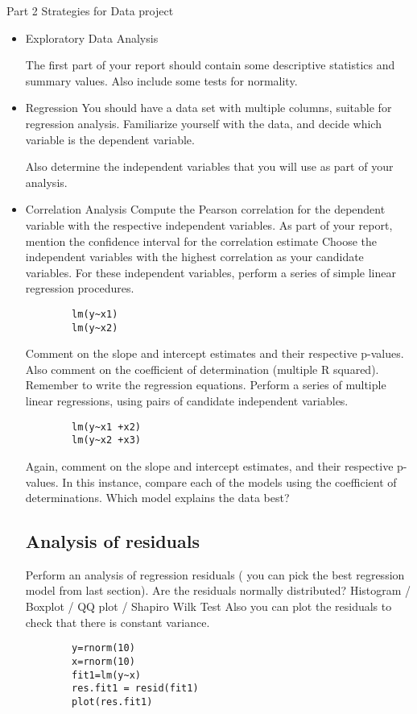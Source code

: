 \documentclass[a4paper,12pt]{article}
\begin{document}
	Part 2 Strategies for Data project
	\begin{itemize}
		\item Exploratory Data Analysis
		
		The first part of your report should contain some descriptive statistics and summary values. Also include some tests for normality.
		
		\item{Regression}
		You should have a data set with multiple columns, suitable for regression analysis.
		Familiarize yourself with the data, and decide which variable is the dependent variable.
		
		Also determine the independent variables that you will use as part of your analysis.
		
		\item{Correlation Analysis}
		Compute the Pearson correlation for the dependent variable with the respective independent variables.  As part of your report, mention the confidence interval for the correlation estimate
		Choose the independent variables with the highest correlation as your candidate variables.
		For these independent variables, perform a series of simple linear regression procedures.
		\begin{verbatim}
		lm(y~x1)
		lm(y~x2)
		\end{verbatim}
		Comment on the slope and intercept estimates and their respective p-values. Also comment on the coefficient of determination (multiple R squared). Remember to write the regression equations.
		Perform a series of multiple linear regressions, using pairs of candidate independent variables.
		\begin{verbatim}
		lm(y~x1 +x2)
		lm(y~x2 +x3)
		\end{verbatim}
		Again, comment on the slope and intercept estimates, and their respective p-values.
		In this instance, compare each of the models using the coefficient of determinations. Which model explains the data best?
		\subsection{Analysis of residuals}
		Perform an analysis of regression residuals ( you can pick the best regression model from last section).
		Are the residuals normally distributed?
		Histogram /  Boxplot / QQ plot / Shapiro Wilk Test
		Also you can plot the residuals to check that there is constant variance.
		\begin{verbatim}
		y=rnorm(10)
		x=rnorm(10)
		fit1=lm(y~x)
		res.fit1 = resid(fit1)
		plot(res.fit1)
		\end{verbatim}
		

\end{itemize}
\end{document}
